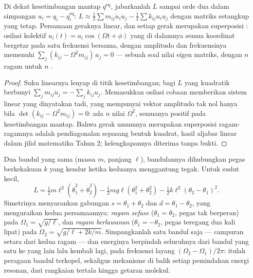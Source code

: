 \begin{proposition}\label{prop:b3:lagrangian-mechanics:modes}
Di dekat kesetimbangan mantap $q^{\text{eq}}$, jabarkanlah $L$ sampai
orde dua dalam simpangan $u_i = q_i - q_i^{\text{eq}}$:
$L \approx \tfrac12\sum m_{ij}\dot u_i\dot u_j -
\tfrac12\sum k_{ij}u_iu_j$ dengan matriks setangkup yang tetap.
Persamaan geraknya linear, dan setiap gerak merupakan superposisi
\emph{}: osilasi kolektif $u_i(t) = a_i\cos(\Omega t
+ \phi)$ yang di dalamnya semua koordinat bergetar pada satu frekuensi
bersama, dengan amplitudo dan frekuensinya memenuhi $\sum_j(k_{ij} -
\Omega^2m_{ij})\,a_j = 0$ --- sebuah soal nilai eigen matriks, dengan
$n$ ragam untuk $n$ .
\end{proposition}

\begin{proof}
Suku linearnya lenyap di titik kesetimbangan; 
bagi $L$ yang kuadratik berbunyi
$\sum_jm_{ij}\ddot u_j = -\sum_jk_{ij}u_j$. Memasukkan osilasi cobaan
memberikan sistem linear yang dinyatakan tadi, yang mempunyai vektor
amplitudo tak nol hanya bila $\det(k_{ij} -
\Omega^2m_{ij}) = 0$: ada $n$ nilai $\Omega^2$, semuanya positif pada
kesetimbangan mantap. Bahwa gerak umumnya merupakan superposisi
ragam-ragamnya adalah pendiagonalan sepasang bentuk kuadrat, hasil
aljabar linear dalam jilid matematika Tahun 2; kelengkapannya diterima
tanpa bukti.
\end{proof}

\begin{example}\label{ex:b3:lagrangian-mechanics:coupled}
Dua bandul yang sama (massa $m$, panjang $\ell$), bandulannya
dihubungkan pegas berkekakuan $k$ yang kendur ketika keduanya
menggantung tegak. Untuk sudut kecil,
\[
L = \tfrac12 m\ell^2(\dot\theta_1^2 + \dot\theta_2^2)
 - \tfrac12 mg\ell(\theta_1^2 + \theta_2^2)
 - \tfrac12 k\ell^2(\theta_2 - \theta_1)^2 .
\]
Simetrinya menyarankan gabungan $s = \theta_1 + \theta_2$ dan $d =
\theta_1 - \theta_2$, yang menguraikan kedua persamaannya: \emph{ragam
sefase} ($\theta_1 = \theta_2$, pegas tak berperan) pada $\Omega_1 =
\sqrt{g/\ell}$, dan \emph{ragam berlawanan} ($\theta_1 = -\theta_2$,
pegas teregang dua kali lipat) pada $\Omega_2 = \sqrt{g/\ell + 2k/m}$.
Simpangkanlah satu bandul saja --- campuran setara dari kedua ragam ---
dan energinya berpindah seluruhnya dari bandul yang satu ke yang lain
lalu kembali lagi, pada frekuensi layang $(\Omega_2 - \Omega_1)/2\pi$:
itulah peragaan bandul terkopel, sekaligus mekanisme di balik setiap
pemindahan energi resonan, dari rangkaian tertala hingga getaran molekul.
\end{example}

